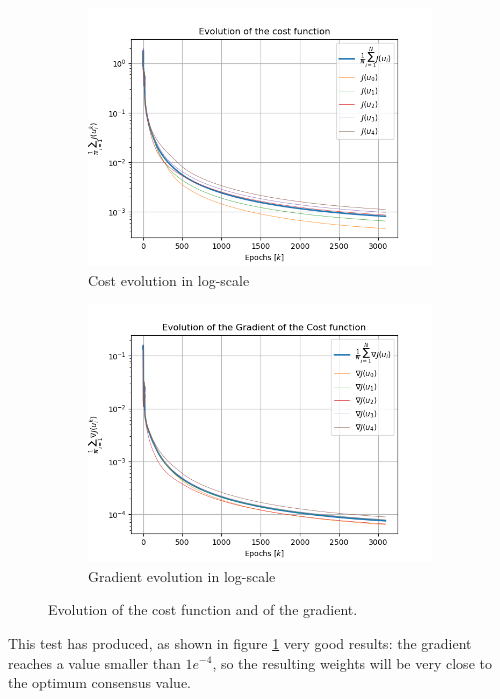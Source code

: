 \documentclass[a4paper,11pt,oneside]{book}
\begin{document}
\begin{figure}[h]
\centering
	\begin{subfigure}{0.49\textwidth}	
	\includegraphics[width=\textwidth]{diminishing/J-log}
	\caption{Cost evolution in log-scale}
	\end{subfigure}
\hfill
	\begin{subfigure}{0.49\textwidth}	
	\includegraphics[width=\textwidth]{diminishing/norm_gradient_J}
	\caption{Gradient evolution in log-scale}
	\end{subfigure}
\caption{Evolution of the cost function and of the gradient.}
\label{diminish_cost_grad}
\end{figure}

This test has produced, as shown in figure \ref{diminish_cost_grad} very good results: the gradient reaches a value smaller than $1e^{-4}$, so the resulting weights will be very close to the optimum consensus value. 
\end{document}
